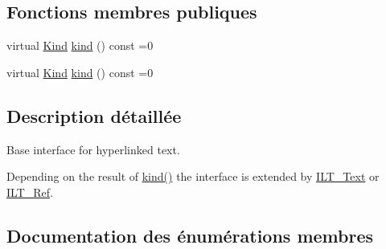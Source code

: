 \subsection*{Fonctions membres publiques}
\begin{DoxyCompactItemize}
\item 
virtual \hyperlink{class_i_linked_text_af18c37822f4819c58c07b327b459c5af}{Kind} \hyperlink{class_i_linked_text_a7dad0268ee6d7c0290784a619be7721d}{kind} () const  =0
\item 
virtual \hyperlink{class_i_linked_text_af18c37822f4819c58c07b327b459c5af}{Kind} \hyperlink{class_i_linked_text_a7dad0268ee6d7c0290784a619be7721d}{kind} () const  =0
\end{DoxyCompactItemize}


\subsection{Description détaillée}
Base interface for hyperlinked text. 

Depending on the result of \hyperlink{class_i_linked_text_a7dad0268ee6d7c0290784a619be7721d}{kind()} the interface is extended by \hyperlink{class_i_l_t___text}{I\+L\+T\+\_\+\+Text} or \hyperlink{class_i_l_t___ref}{I\+L\+T\+\_\+\+Ref}. 

\subsection{Documentation des énumérations membres}
\hypertarget{class_i_linked_text_af18c37822f4819c58c07b327b459c5af}{}
